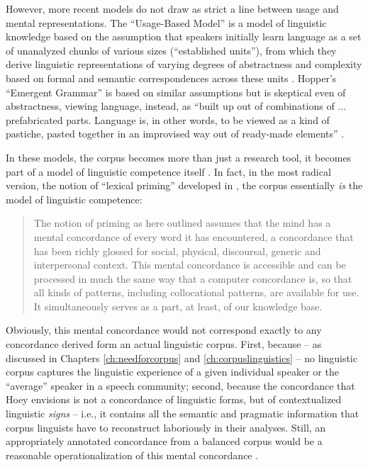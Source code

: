 However, more recent models do not draw as strict a line between usage and mental representations. The ``Usage-Based Model'' \citep{langacker_concept_1991} is a model of linguistic knowledge based on the assumption that speakers initially learn language as a set of unanalyzed chunks of various sizes (``established units''), from which they derive linguistic representations of varying degrees of abstractness and complexity based on formal and semantic correspondences across these units \citet[cf.][266f]{langacker_concept_1991}. Hopper's ``Emergent Grammar'' is based on similar assumptions but is skeptical even of abstractness, viewing language, instead, as ``built up out of combinations of ... prefabricated parts. Language is, in other words, to be viewed as a kind of pastiche, pasted together in an improvised way out of ready-made elements'' \citep[144]{hopper_emergent_1987}.

In these models, the corpus becomes more than just a research tool, it becomes part of a model of linguistic competence itself \citep[cf.][]{brdar_cognitive_2011}. In fact, in the most radical version, the notion of ``lexical priming'' developed in \citet{hoey_lexical_2005}, the corpus essentially \textit{is} the model of linguistic competence:

\begin{quotation}
The notion of priming as here outlined assumes that the mind has a mental concordance of every word it has encountered, a concordance that has been richly glossed for social, physical, discoursal, generic and interpersonal context. This mental concordance is accessible and can be processed in much the same way that a computer concordance is, so that all kinds of patterns, including collocational patterns, are available for use. It simultaneously serves as a part, at least, of our knowledge base. \citep[11]{hoey_lexical_2005}
\end{quotation}

Obviously, this mental concordance would not correspond exactly to any concordance derived form an actual linguistic corpus. First, because -- as discussed in Chapters \ref{ch:needforcorpus} and \ref{ch:corpuslinguistics} -- no linguistic corpus captures the linguistic experience of a given individual speaker or the ``average'' speaker in a speech community; second, because the concordance that Hoey envisions is not a concordance of linguistic forms, but of contextualized linguistic \textit{signs} -- i.e., it contains all the semantic and pragmatic information that corpus linguists have to reconstruct laboriously in their analyses. Still, an appropriately annotated concordance from a balanced corpus would be a reasonable operationalization of this mental concordance \citep[cf. also][]{taylor_mental_2012}.

